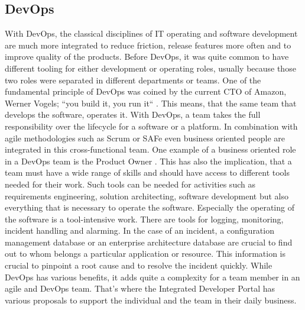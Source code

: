 \documentclass[a4paper,12pt]{article}
\begin{document}
    \subsection{DevOps}
    \label{subsec:devops}
    With DevOps, the classical disciplines of IT operating and software development are much more integrated to reduce
    friction, release features more often and to improve quality of the products\parencite{safedevops}.
    Before DevOps, it was quite common to have different tooling for either development or operating roles, usually
    because those two roles were separated in different departments or teams.
    One of the fundamental principle of DevOps was coined by the current CTO of Amazon, Werner Vogels;
    ``you build it, you run it``\parencite{vogels} .
    This means, that the same team that develops the software, operates it.
    With DevOps, a team takes the full responsibility over the lifecycle for a software or a platform.
    In combination with agile methodologies such as Scrum or SAFe even business oriented people are integrated in this
    cross-functional team.
    One example of a business oriented role in a DevOps team is the Product Owner\parencite{safepo} .
    This has also the implication, that a team must have a wide range of skills and should have access to different
    tools needed for their work.
    Such tools can be needed for activities such as requirements engineering, solution architecting, software development
    but also everything that is necessary to operate the software.
    Especially the operating of the software is a tool-intensive work.
    There are tools for logging, monitoring, incident handling and alarming.
    In the case of an incident, a configuration management database or an enterprise architecture database are crucial
    to find out to whom belongs a particular application or resource.
    This information is crucial to pinpoint a root cause and to resolve the incident quickly.
    While DevOps has various benefits, it adds quite a complexity for a team member in an agile and DevOps team.
    That's where the Integrated Developer Portal has various proposals to support the individual and the team in their
    daily business.
\end{document}

